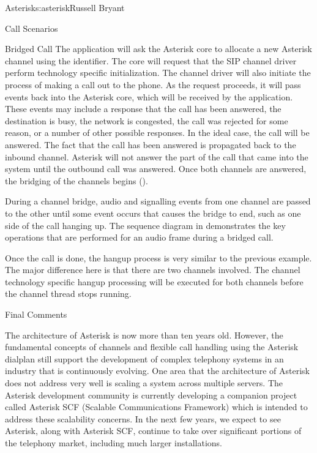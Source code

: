 \begin{aosachapter}{Asterisk}{s:asterisk}{Russell Bryant}
\begin{aosasect1}{Call Scenarios}
\begin{aosasect2}{Bridged Call}
The  application will ask the Asterisk core to allocate a
new Asterisk channel using the  identifier. The core
will request that the SIP channel driver perform technology specific
initialization. The channel driver will also initiate the process of
making a call out to the phone. As the request proceeds, it will pass
events back into the Asterisk core, which will be received by the
 application. These events may include a response that the
call has been answered, the destination is busy, the network is
congested, the call was rejected for some reason, or a number of other
possible responses. In the ideal case, the call will be answered. The
fact that the call has been answered is propagated back to the inbound
channel. Asterisk will not answer the part of the call that came into
the system until the outbound call was answered.  Once both channels
are answered, the bridging of the channels begins
().


During a channel bridge, audio and signalling events from one channel
are passed to the other until some event occurs that causes the bridge
to end, such as one side of the call hanging up. The sequence diagram
in  demonstrates the key
operations that are performed for an audio frame during a bridged
call.


Once the call is done, the hangup process is very similar to the
previous example. The major difference here is that there are two
channels involved. The channel technology specific hangup processing
will be executed for both channels before the channel thread stops
running.

\end{aosasect2}

\end{aosasect1}

\begin{aosasect1}{Final Comments}

The architecture of Asterisk is now more than ten years old.  However,
the fundamental concepts of channels and flexible call handling using
the Asterisk dialplan still support the development of complex
telephony systems in an industry that is continuously evolving. One
area that the architecture of Asterisk does not address very well is
scaling a system across multiple servers. The Asterisk development
community is currently developing a companion project called Asterisk
SCF (Scalable Communications Framework) which is intended to address
these scalability concerns. In the next few years, we expect to see
Asterisk, along with Asterisk SCF, continue to take over significant
portions of the telephony market, including much larger installations.


\end{aosasect1}
\end{aosachapter}

